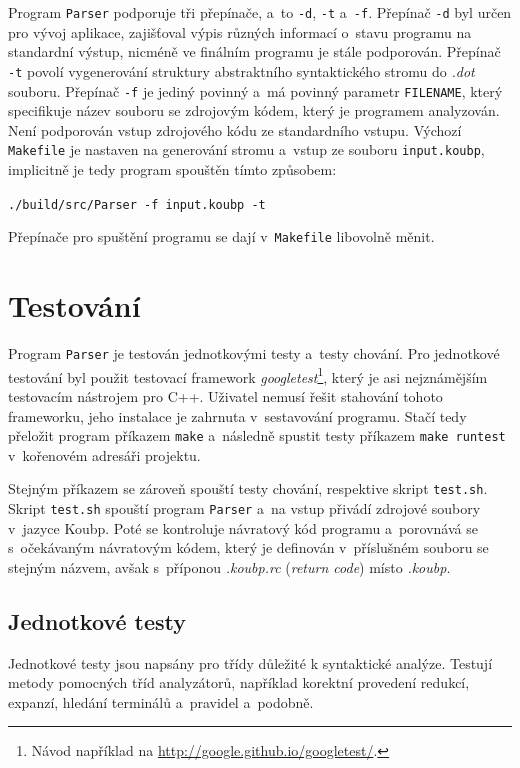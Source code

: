 Program \texttt{Parser} podporuje tři přepínače, a~to \texttt{-d}, \texttt{-t} a~\texttt{-f}.
Přepínač \texttt{-d} byl určen pro vývoj aplikace, zajišťoval výpis různých informací o~stavu programu na standardní výstup, nicméně ve finálním programu je stále podporován.
Přepínač \texttt{-t} povolí vygenerování struktury abstraktního syntaktického stromu do \emph{.dot} souboru.
Přepínač \texttt{-f} je jediný povinný a~má povinný parametr \texttt{FILENAME}, který specifikuje název souboru se zdrojovým kódem, který je programem analyzován.
Není podporován vstup zdrojového kódu ze standardního vstupu.
Výchozí \texttt{Makefile} je nastaven na generování stromu a~vstup ze souboru \texttt{input.koubp}, implicitně je tedy program spouštěn tímto způsobem:
\begin{center}
    \texttt{./build/src/Parser -f input.koubp -t}
\end{center}
Přepínače pro spuštění programu se dají v~\texttt{Makefile} libovolně měnit.


\section{Testování}
Program \texttt{Parser} je testován jednotkovými testy a~testy chování.
Pro jednotkové testování byl použit testovací framework \emph{googletest}\footnote{Návod například na \href{http://google.github.io/googletest/}{http://google.github.io/googletest/}.}, který je asi nejznámějším testovacím nástrojem pro C++.
Uživatel nemusí řešit stahování tohoto frameworku, jeho instalace je zahrnuta v~sestavování programu.
Stačí tedy přeložit program příkazem \texttt{make} a~následně spustit testy příkazem \texttt{make runtest} v~kořenovém adresáři projektu.

Stejným příkazem se zároveň spouští testy chování, respektive skript \texttt{test.sh}.
Skript \texttt{test.sh} spouští program \texttt{Parser} a~na vstup přivádí zdrojové soubory v~jazyce Koubp.
Poté se kontroluje návratový kód programu a~porovnává se s~očekávaným návratovým kódem, který je definován v~příslušném souboru se stejným názvem, avšak s~příponou \emph{.koubp.rc} (\emph{return code}) místo \emph{.koubp}.

\subsection*{Jednotkové testy}
Jednotkové testy jsou napsány pro třídy důležité k syntaktické analýze.
Testují metody pomocných tříd analyzátorů, například korektní provedení redukcí, expanzí, hledání terminálů a~pravidel a~podobně.

